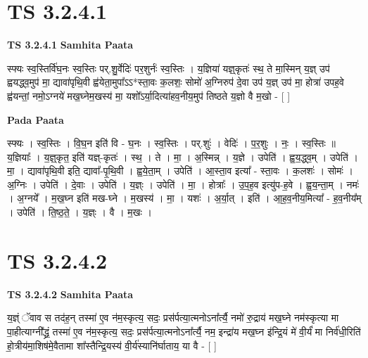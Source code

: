 \documentclass[17pt]{extarticle}
\begin{document}
\section*{ TS 3.2.4.1 }

\textbf{TS 3.2.4.1 } \newline
\textbf{Samhita Paata} \newline

स्फ्यः स्व॒स्तिर्वि॑घ॒नः स्व॒स्तिः पर्.शु॒र्वेदिः॑ पर॒शुर्नः॑ स्व॒स्तिः । य॒ज्ञिया॑ यज्ञ्॒कृतः॑ स्थ॒ ते मा॒स्मिन् य॒ज्ञ् उप॑ ह्वयद्ध्व॒मुप॑ मा॒ द्यावा॑पृथि॒वी ह्व॑येता॒मुपा᳚ऽऽ*स्ता॒वः क॒लशः॒ सोमो॑ अ॒ग्निरुप॑ दे॒वा उप॑ य॒ज्ञ् उप॑ मा॒ होत्रा॑ उपह॒वे ह्व॑यन्तां॒ नमो॒ऽग्नये॑ मख॒घ्नेम॒खस्य॑ मा॒ यशो᳚ऽर्या॒दित्या॑हव॒नीय॒मुप॑ तिष्ठते य॒ज्ञो वै म॒खो - [  ] \newline

\textbf{Pada Paata} \newline

स्फ्यः । स्व॒स्तिः । वि॒घ॒न इति॑ वि - घ॒नः । स्व॒स्तिः । पर्.शुः॑ । वेदिः॑ । प॒र॒शुः । नः॒ । स्व॒स्तिः ॥ य॒ज्ञियाः᳚ । य॒ज्ञ्॒कृत॒ इति॑ यज्ञ्-कृतः॑ । स्थ॒ । ते । मा॒ । अ॒स्मिन्न् । य॒ज्ञे । उपेति॑ । ह्व॒य॒द्ध्व॒म् । उपेति॑ । मा॒ । द्यावा॑पृथि॒वी इति॒ द्यावा᳚-पृ॒थि॒वी । ह्व॒ये॒ता॒म् । उपेति॑ । आ॒स्ता॒व इत्या᳚ - स्ता॒वः । क॒लशः॑ । सोमः॑ । अ॒ग्निः । उपेति॑ । दे॒वाः । उपेति॑ । य॒ज्ञ्ः । उपेति॑ । मा॒ । होत्राः᳚ । उ॒प॒ह॒व इत्यु॑प-ह॒वे । ह्व॒य॒न्ता॒म् । नमः॑ । अ॒ग्नये᳚ । म॒ख॒घ्न इति॑ मख-घ्ने । म॒खस्य॑ । मा॒ । यशः॑ । अ॒र्या॒त् । इति॑ । आ॒ह॒व॒नीय॒मित्या᳚ - ह॒व॒नीय᳚म् । उपेति॑ । ति॒ष्ठ॒ते॒ । य॒ज्ञ्ः । वै । म॒खः ।  \newline




\section*{ TS 3.2.4.2 }

\textbf{TS 3.2.4.2 } \newline
\textbf{Samhita Paata} \newline

य॒ज्ञ्ं ॅवाव स तद॑ह॒न् तस्मा॑ ए॒व न॑म॒स्कृत्य॒ सदः॒ प्रस॑र्पत्या॒त्मनोऽना᳚र्त्यै॒ नमो॑ रु॒द्राय॑ मख॒घ्ने नम॑स्कृत्या मा पा॒हीत्याग्नी᳚द्ध्रं॒ तस्मा॑ ए॒व न॑म॒स्कृत्य॒ सदः॒ प्रस॑र्पत्या॒त्मनोऽना᳚र्त्यै॒ नम॒ इन्द्रा॑य मख॒घ्न इ॑न्द्रि॒यं मे॑ वी॒र्यं॑ मा निर्व॑धी॒रिति॑ हो॒त्रीय॑मा॒शिष॑मे॒वैतामा शा᳚स्तैन्द्रि॒यस्य॑ वी॒र्य॑स्यानि॑र्घाताय॒ या वै - [  ] \newline
\end{document}
